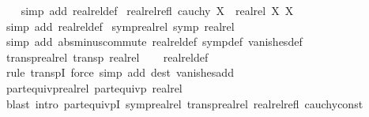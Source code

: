 \begin{isabellebody}
%
\isadelimproof
\ \ %
\endisadelimproof
%
\isatagproof
{}\isamarkupfalse%
\ {\isacharparenleft}{\kern0pt}simp\ add{\isacharcolon}{\kern0pt}\ realrel{\isacharunderscore}{\kern0pt}def{\isacharparenright}{\kern0pt}%
\endisatagproof
{\isafoldproof}%
%
\isadelimproof
\isanewline
%
\endisadelimproof
\isanewline
{}\isamarkupfalse%
\ realrel{\isacharunderscore}{\kern0pt}refl{\isacharcolon}{\kern0pt}\ {\isachardoublequoteopen}cauchy\ X\ {\isasymLongrightarrow}\ realrel\ X\ X{\isachardoublequoteclose}\isanewline
%
\isadelimproof
\ \ %
\endisadelimproof
%
\isatagproof
{}\isamarkupfalse%
\ {\isacharparenleft}{\kern0pt}simp\ add{\isacharcolon}{\kern0pt}\ realrel{\isacharunderscore}{\kern0pt}def{\isacharparenright}{\kern0pt}%
\endisatagproof
{\isafoldproof}%
%
\isadelimproof
\isanewline
%
\endisadelimproof
\isanewline
{}\isamarkupfalse%
\ symp{\isacharunderscore}{\kern0pt}realrel{\isacharcolon}{\kern0pt}\ {\isachardoublequoteopen}symp\ realrel{\isachardoublequoteclose}\isanewline
%
\isadelimproof
\ \ %
\endisadelimproof
%
\isatagproof
{}\isamarkupfalse%
\ {\isacharparenleft}{\kern0pt}simp\ add{\isacharcolon}{\kern0pt}\ abs{\isacharunderscore}{\kern0pt}minus{\isacharunderscore}{\kern0pt}commute\ realrel{\isacharunderscore}{\kern0pt}def\ symp{\isacharunderscore}{\kern0pt}def\ vanishes{\isacharunderscore}{\kern0pt}def{\isacharparenright}{\kern0pt}%
\endisatagproof
{\isafoldproof}%
%
\isadelimproof
\isanewline
%
\endisadelimproof
\isanewline
{}\isamarkupfalse%
\ transp{\isacharunderscore}{\kern0pt}realrel{\isacharcolon}{\kern0pt}\ {\isachardoublequoteopen}transp\ realrel{\isachardoublequoteclose}\isanewline
%
\isadelimproof
\ \ %
\endisadelimproof
%
\isatagproof
{}\isamarkupfalse%
\ realrel{\isacharunderscore}{\kern0pt}def\isanewline
\ \ \isamarkupfalse%
\ {\isacharparenleft}{\kern0pt}rule\ transpI{\isacharparenright}{\kern0pt}\ {\isacharparenleft}{\kern0pt}force\ simp\ add{\isacharcolon}{\kern0pt}\ dest{\isacharcolon}{\kern0pt}\ vanishes{\isacharunderscore}{\kern0pt}add{\isacharparenright}{\kern0pt}%
\endisatagproof
{\isafoldproof}%
%
\isadelimproof
\isanewline
%
\endisadelimproof
\isanewline
{}\isamarkupfalse%
\ part{\isacharunderscore}{\kern0pt}equivp{\isacharunderscore}{\kern0pt}realrel{\isacharcolon}{\kern0pt}\ {\isachardoublequoteopen}part{\isacharunderscore}{\kern0pt}equivp\ realrel{\isachardoublequoteclose}\isanewline
%
\isadelimproof
\ \ %
\endisadelimproof
%
\isatagproof
{}\isamarkupfalse%
\ {\isacharparenleft}{\kern0pt}blast\ intro{\isacharcolon}{\kern0pt}\ part{\isacharunderscore}{\kern0pt}equivpI\ symp{\isacharunderscore}{\kern0pt}realrel\ transp{\isacharunderscore}{\kern0pt}realrel\ realrel{\isacharunderscore}{\kern0pt}refl\ cauchy{\isacharunderscore}{\kern0pt}const{\isacharparenright}{\kern0pt}%

\end{isabellebody}
